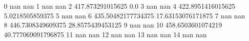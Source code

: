 0 nan nan
1 nan nan
2 417.873291015625 0.0
3 nan nan
4 422.8951416015625 5.0218505859375
5 nan nan
6 435.50482177734375 17.63153076171875
7 nan nan
8 446.7308349609375 28.8575439453125
9 nan nan
10 458.6503601074219 40.777069091796875
11 nan nan
12 nan nan
13 nan nan
14 nan nan
